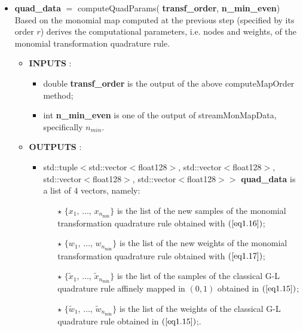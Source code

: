 \documentclass[a4paper, twosided]{book}
\begin{document}
\begin{itemize}
    \item \color{poliDarkBlue} \textbf{quad\_data} \color{black} $=$ \colorbox{poliGrayBlue}{computeQuadParams}(\color{poliDarkBlue} \textbf{transf\_order}\color{black}, \color{poliDarkBlue} \textbf{n\_min\_even}\color{black})
    \newline Based on the monomial map computed at the previous step (specified by its order $r$) derives the computational parameters, i.e. nodes and weights, of the monomial transformation quadrature rule.
    \begin{itemize}
        \item \color{poliDarkBlue} \textbf{INPUTS} \color{black}:
        \begin{itemize}
            \item \colorbox{poliGrayBlue}{double} \color{poliDarkBlue} \textbf{transf\_order} \color{black} is the output of the above \colorbox{poliGrayBlue}{computeMapOrder} method;
            \item \colorbox{poliGrayBlue}{int} \color{poliDarkBlue} \textbf{n\_min\_even} \color{black} is one of the output of \colorbox{poliGrayBlue}{streamMonMapData}, specifically $n_{min}$.
        \end{itemize}
        \item \color{poliDarkBlue} \textbf{OUTPUTS} \color{black}:
        \begin{itemize}
            \item \colorbox{poliGrayBlue}{std::tuple$<$std::vector$<$float128$>$, std::vector$<$float128$>$, std::vector$<$float128$>$, std::vector$<$float128$>>$} \color{poliDarkBlue} \textbf{quad\_data} \color{black} is a list of $4$ vectors, namely:
            \begin{itemize}
                \item[\color{poliDarkBlue} $\star$] $\{x_1,\,\dots,\,x_{n_{\text{min}}}\}$ is the list of the new samples of the monomial transformation quadrature rule obtained with $(\ref{eq1.16})$;
                \item[\color{poliDarkBlue} $\star$] $\{w_1,\,\dots,\,w_{n_{\text{min}}}\}$ is the list of the new weights of the monomial transformation quadrature rule obtained with $(\ref{eq1.17})$;
                \item[\color{poliDarkBlue} $\star$] $\{\tilde{x}_1,\,\dots,\,\tilde{x}_{n_{\text{min}}}\}$ is the list of the samples of the classical G-L quadrature rule affinely mapped in $(0,1)$ obtained in $(\ref{eq1.15})$;
                \item[\color{poliDarkBlue} $\star$] $\{\tilde{w}_1,\,\dots,\,\tilde{w}_{n_{\text{min}}}\}$ is the list of the weights of the classical G-L quadrature rule obtained in $(\ref{eq1.15})$;.
            \end{itemize}
        \end{itemize}
    \end{itemize}
    

\end{itemize}
\end{document}
